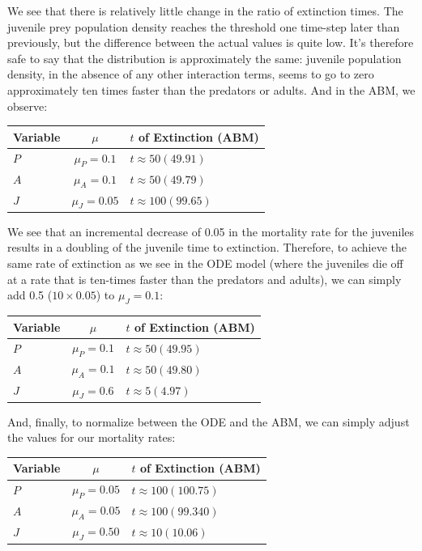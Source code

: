 \documentclass[12pt]{article}
\begin{document}
We see that there is relatively little change in the ratio of extinction times. The juvenile prey population density reaches the threshold one time-step later than previously, but the difference between the actual values is quite low. It's therefore safe to say that the distribution is approximately the same: juvenile population density, in the absence of any other interaction terms, seems to go to zero approximately ten times faster than the predators or adults. And in the ABM, we observe:

\begin{center}
	\begin{tabular}{| l | c | l | }
	\hline
	Variable & $\mu$ & $t$ of Extinction (ABM) \\ \hline
	$P$  & $\mu_P = 0.1$ &  $t \approx 50 (49.91)$\\ \hline
	$A$ & $\mu_A = 0.1$ & $t \approx 50 (49.79)$ \\ \hline
	$J$  & $\mu_J = 0.05 $ & $t \approx 100 ( 99.65)$  \\ \hline
	\end{tabular}
 \end{center}

We see that an incremental decrease of 0.05 in the mortality rate for the juveniles results in a doubling of the juvenile time to extinction. Therefore, to achieve the same rate of extinction as we see in the ODE model (where the juveniles die off at a rate that is ten-times faster than the predators and adults), we can simply add 0.5 ($10\times 0.05$) to $\mu_J = 0.1$:

\begin{center}
	\begin{tabular}{| l | c | l | }
	\hline
	Variable & $\mu$ & $t$ of Extinction (ABM) \\ \hline
	$P$  & $\mu_P = 0.1$ &  $t \approx 50 (49.95)$\\ \hline
	$A$ & $\mu_A = 0.1$ & $t \approx 50 (49.80)$ \\ \hline
	$J$  & $\mu_J = 0.6 $ & $t \approx 5 ( 4.97)$  \\ \hline
	\end{tabular}
 \end{center}

And, finally, to normalize between the ODE and the ABM, we can simply adjust the values for our mortality rates:

\begin{center}
	\begin{tabular}{| l | c | l | }
	\hline
	Variable & $\mu$ & $t$ of Extinction (ABM) \\ \hline
	$P$  & $\mu_P = 0.05$ &  $t \approx 100 (100.75)$\\ \hline
	$A$ & $\mu_A = 0.05$ & $t \approx 100 (99.340)$ \\ \hline
	$J$  & $\mu_J = 0.50 $ & $t \approx 10 ( 10.06)$  \\ \hline
	\end{tabular}
 \end{center}
\end{document}
